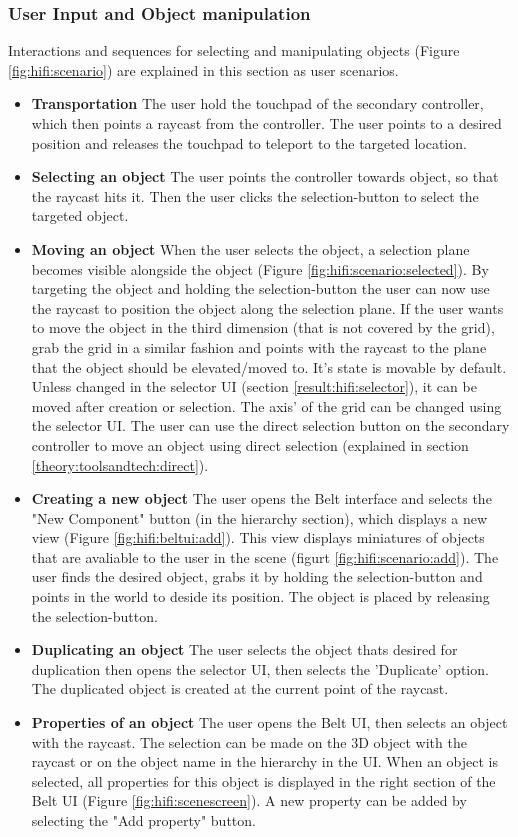 \subsubsection{User Input and Object manipulation}
Interactions and sequences for selecting and manipulating objects (Figure \ref{fig:hifi:scenario}) are explained in this section as user scenarios.
\begin{itemize}
  \item \textbf{Transportation} The user hold the touchpad of the secondary controller, which then points a raycast from the controller. The user points to a desired position and releases the touchpad to teleport to the targeted location.
  \item \textbf{Selecting an object} The user points the controller towards object, so that the raycast hits it. Then the user clicks the selection-button to select the targeted object.
  \item \textbf{Moving an object} When the user selects the object,  a selection plane becomes visible alongside the object (Figure \ref{fig:hifi:scenario:selected}). By targeting the object and holding the selection-button the user can now use the raycast to position the object along the selection plane. If the user wants to move the object in the third dimension (that is not covered by the grid), grab the grid in a similar fashion and points with the raycast to the plane that the object should be elevated/moved to. It's state is movable by default. Unless changed in the selector UI (section \ref{result:hifi:selector}), it can be moved after creation or selection. The axis' of the grid can be changed using the selector UI. The user can use the direct selection button on the secondary controller to move an object using direct selection (explained in section \ref{theory:toolsandtech:direct}).
  \item \textbf{Creating a new object} The user opens the Belt interface and selects the "New Component" button (in the hierarchy section), which displays a new view (Figure \ref{fig:hifi:beltui:add}). This view displays miniatures of objects that are avaliable to the user in the scene (figurt \ref{fig:hifi:scenario:add}). The user finds the desired object, grabs it by holding the selection-button and points in the world to deside its position. The object is placed by releasing the selection-button.
  \item \textbf{Duplicating an object} The user selects the object thats desired for duplication then opens the selector UI, then selects the 'Duplicate' option. The duplicated object is created at the current point of the raycast.
  \item \textbf{Properties of an object} The user opens the Belt UI, then selects an object with the raycast. The selection can be made on the 3D object with the raycast or on the object name in the hierarchy in the UI. When an object is selected, all properties for this object is displayed in the right section of the Belt UI (Figure \ref{fig:hifi:scenescreen}). A new property can be added by selecting the "Add property" button.
\end{itemize}

